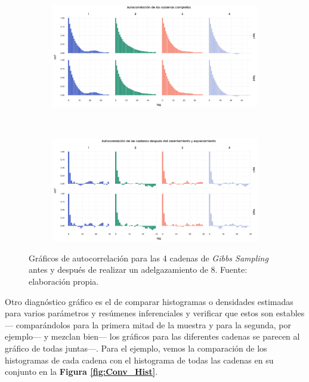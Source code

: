 \begin{figure}[h]
    \centering
    \begin{subfigure}{0.45\textwidth}
        \includegraphics[width=\textwidth]{Figs/Bayes/Ejemplos_Convergencia_Autocorr_Completas}
    \end{subfigure}
    ~ 
    \begin{subfigure}{0.45\textwidth}
        \includegraphics[width=\textwidth]{Figs/Bayes/Ejemplos_Convergencia_Autocorr_Final}
    \end{subfigure}
    \caption{Gráficos de autocorrelación para las 4 cadenas de \textit{Gibbs Sampling} antes y después de realizar un adelgazamiento de 8. Fuente: elaboración propia.}\label{fig:Conv_Autocorr}
\end{figure}

Otro diagnóstico gráfico es el de comparar histogramas o densidades estimadas para varios parámetros y resúmenes inferenciales y verificar que estos son estables--- comparándolos para la primera mitad de la muestra y para la segunda, por ejemplo--- y mezclan bien--- los gráficos para las diferentes cadenas se parecen al gráfico de todas juntas---. Para el ejemplo, vemos la comparación de los histogramas de cada cadena con el histograma de todas las cadenas en su conjunto en la \textbf{Figura \ref{fig:Conv_Hist}}.\\

